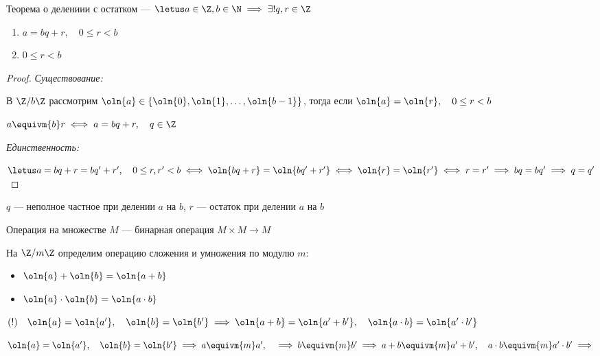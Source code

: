 \begin{follow}

    Теорема о делениии с остатком --- $\letus a \in \Z, b \in \N \implies \exists! q, r \in \Z$
    \begin{enumerate}
        \item $a = bq + r, \quad 0 \leq r < b$
        \item $0 \leq r < b$
    \end{enumerate}
\end{follow}

\begin{proof}

    \textsl{Существование:}

    В $\Z/b\Z$ рассмотрим $\oln{a} \in \{\oln{0}, \oln{1}, \ldots, \oln{b-1}\}$, тогда если $\oln{a} = \oln{r}, \quad 0 \leq r < b$

    $a \equivm{b} r \iff a = bq + r, \quad q \in \Z$

    \textsl{Единственность:}

    $\letus a = bq + r = bq' + r', \quad 0 \leq r, r' < b \iff \oln{bq+r} = \oln{bq'+r'} \iff \oln{r} = \oln{r'} \iff r = r' \implies bq = bq' \implies q = q'$

\end{proof}

\begin{defn}
    $q$ --- неполное частное при делении $a$ на $b$, $r$ --- остаток при делении $a$ на $b$
\end{defn}

\begin{defn}
    Операция на множестве $M$ --- бинарная операция $M \times M \to M$
\end{defn}

На $\Z/m\Z$ определим операцию сложения и умножения по модулю $m$:

\begin{itemize}
    \item $\oln{a} + \oln{b} = \oln{a + b}$
    
    \item $\oln{a} \cdot \oln{b} = \oln{a \cdot b}$
\end{itemize}

$(!) \quad \oln{a} = \oln{a'}, \quad \oln{b} = \oln{b'} \implies \oln{a + b} = \oln{a' + b'}, \quad \oln{a \cdot b} = \oln{a' \cdot b'}$

$\oln{a} = \oln{a'}, \quad \oln{b} = \oln{b'} \implies a \equivm{m} a', \quad \implies b \equivm{m} b' \implies a + b \equivm{m} a' + b', \quad a \cdot b \equivm{m} a' \cdot b' \implies$


